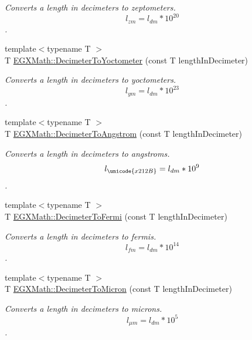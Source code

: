 \begin{DoxyCompactItemize}
\begin{DoxyCompactList}\small\item\em Converts a length in decimeters to zeptometers. \[ l_{zm}=l_{dm} * 10^{20} \]. \end{DoxyCompactList}\item 
{\footnotesize template$<$typename T $>$ }\\T \mbox{\hyperlink{group___e_g_x_math-_conversions-_length_conversions-_s_i-_decimeter-_s_i_ga9da3b12a8bfe244f7af0cc13cf0de4a8}{E\+G\+X\+Math\+::\+Decimeter\+To\+Yoctometer}} (const T length\+In\+Decimeter)
\begin{DoxyCompactList}\small\item\em Converts a length in decimeters to yoctometers. \[ l_{ym}=l_{dm} * 10^{23} \]. \end{DoxyCompactList}\item 
{\footnotesize template$<$typename T $>$ }\\T \mbox{\hyperlink{group___e_g_x_math-_conversions-_length_conversions-_s_i-_decimeter-_non-_s_i_gaffa5876e4f15bc859c369e8bfb9e4183}{E\+G\+X\+Math\+::\+Decimeter\+To\+Angstrom}} (const T length\+In\+Decimeter)
\begin{DoxyCompactList}\small\item\em Converts a length in decimeters to angstroms. \[ l_{\unicode{x212B}}=l_{dm} * 10^{9} \]. \end{DoxyCompactList}\item 
{\footnotesize template$<$typename T $>$ }\\T \mbox{\hyperlink{group___e_g_x_math-_conversions-_length_conversions-_s_i-_decimeter-_non-_s_i_ga2163b07afe9c89c1a1150516f615ef2a}{E\+G\+X\+Math\+::\+Decimeter\+To\+Fermi}} (const T length\+In\+Decimeter)
\begin{DoxyCompactList}\small\item\em Converts a length in decimeters to fermis. \[ l_{fm}=l_{dm} * 10^{14} \]. \end{DoxyCompactList}\item 
{\footnotesize template$<$typename T $>$ }\\T \mbox{\hyperlink{group___e_g_x_math-_conversions-_length_conversions-_s_i-_decimeter-_non-_s_i_gaebafc6e167156bb5158e5d335b25334b}{E\+G\+X\+Math\+::\+Decimeter\+To\+Micron}} (const T length\+In\+Decimeter)
\begin{DoxyCompactList}\small\item\em Converts a length in decimeters to microns. \[ l_{\mu m}=l_{dm} * 10^{5} \]. \end{DoxyCompactList}\item 

\end{DoxyCompactItemize}
